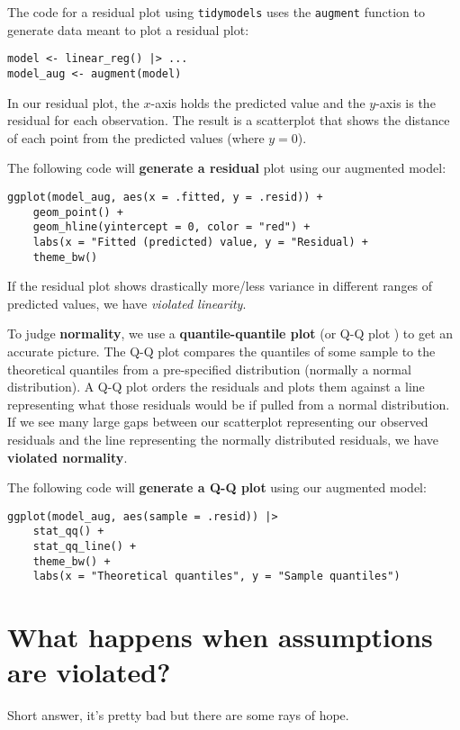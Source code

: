 \documentclass[titlepage, 12pt, leqno]{article}
\begin{document}
The code for a residual plot using \texttt{tidymodels} uses the \texttt{augment} 
function to generate data meant to plot a residual plot:
\begin{verbatim}
model <- linear_reg() |> ...
model_aug <- augment(model)
\end{verbatim}

In our residual plot, the $x$-axis holds the predicted value and the $y$-axis
is the residual for each observation. The result is a scatterplot that shows
the distance of each point from the predicted values (where $y=0$).

\vspace{30px}
The following code will \textbf{generate a residual} plot using our augmented
model:
\begin{verbatim}
ggplot(model_aug, aes(x = .fitted, y = .resid)) +
    geom_point() +
    geom_hline(yintercept = 0, color = "red") +
    labs(x = "Fitted (predicted) value, y = "Residual) +
    theme_bw()
\end{verbatim}

If the residual plot shows drastically more/less variance in different ranges of
predicted values, we have \textit{violated linearity}.

To judge \textbf{normality}, we use a \textbf{quantile-quantile plot} (or Q-Q plot
) to get an accurate picture. The Q-Q plot compares the quantiles of some sample
to the theoretical quantiles from a pre-specified distribution (normally a
normal distribution). A Q-Q plot orders the residuals and plots them against a 
line representing what those residuals would be if pulled from a normal 
distribution. If we see many large gaps between our scatterplot representing our
observed residuals and the line representing the normally distributed residuals,
we have \textbf{violated normality}.

The following code will \textbf{generate a Q-Q plot} using our augmented model:
\begin{verbatim}
ggplot(model_aug, aes(sample = .resid)) |>
    stat_qq() +
    stat_qq_line() +
    theme_bw() +
    labs(x = "Theoretical quantiles", y = "Sample quantiles")
\end{verbatim}

\pagebreak
\section{What happens when assumptions are violated?}
Short answer, it's pretty bad but there are some rays of hope.
\end{document}
